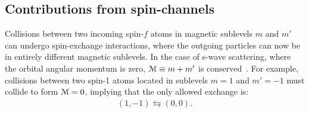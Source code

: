 \subsection{Contributions from spin-channels}
Collisions between two incoming spin-\(f\) atoms in magnetic sublevels \(m\)
and \(m'\) can undergo spin-exchange interactions, where the outgoing particles
can now be in entirely different magnetic sublevels.
In the case of s-wave scattering, where the orbital angular momentum is zero,
\(\EuScript{M} \equiv m + m'\) is conserved~\cite{Kawaguchi2012}.
For example, collisions between two spin-1 atoms located in sublevels \(m=1\)
and \(m'=-1\) must collide to form \(\EuScript{M} = 0\), implying that the only
allowed exchange is:
\begin{align}\label{eq: spin-1-exchanges}
    (1, -1) \leftrightarrows (0, 0).
\end{align}


